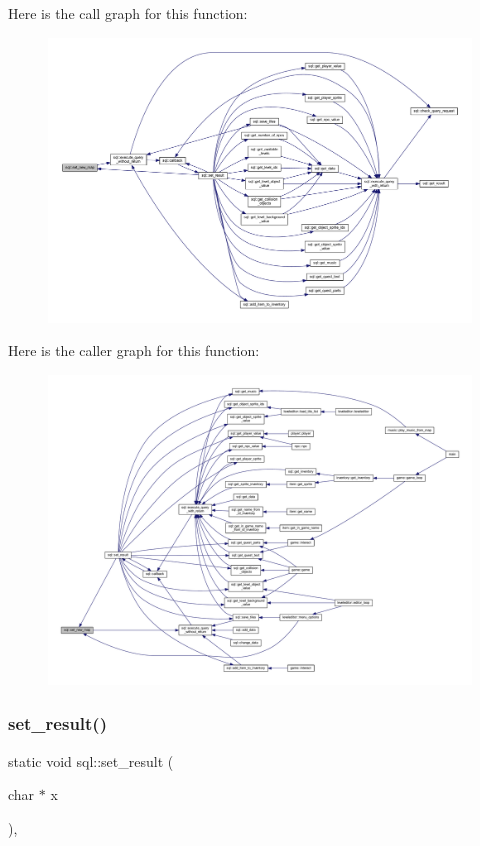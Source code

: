 Here is the call graph for this function\+:
\nopagebreak
\begin{figure}[H]
\begin{center}
\leavevmode
\includegraphics[width=350pt]{classsql_ac24a3682f7478f78508e3e433b637407_cgraph}
\end{center}
\end{figure}
Here is the caller graph for this function\+:
\nopagebreak
\begin{figure}[H]
\begin{center}
\leavevmode
\includegraphics[width=350pt]{classsql_ac24a3682f7478f78508e3e433b637407_icgraph}
\end{center}
\end{figure}
\mbox{\label{classsql_ad28cc81f2ee03c6a15d26ff216353d71}} 
\subsubsection{\texorpdfstring{set\+\_\+result()}{set\_result()}}
{\footnotesize\ttfamily static void sql\+::set\+\_\+result (\begin{DoxyParamCaption}\item[{char $\ast$}]{x }\end{DoxyParamCaption})\hspace{0.3cm}{\ttfamily [inline]}, {\ttfamily [static]}}



